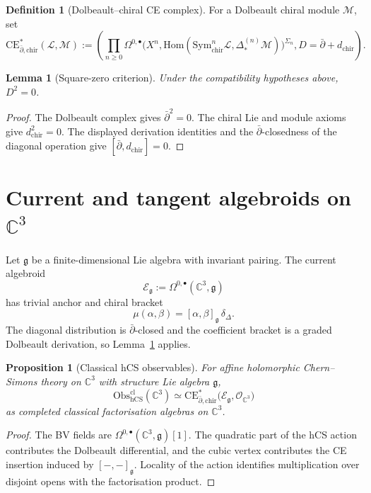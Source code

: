 \documentclass[11pt]{amsart}
\providecommand{\C}{\mathbb{C}}
\providecommand{\dbar}{\bar{\partial}}
\providecommand{\g}{\mathfrak{g}}
\providecommand{\Obs}{\mathrm{Obs}}
\providecommand{\Sym}{\mathrm{Sym}}
\providecommand{\CE}{\mathrm{CE}}
\providecommand{\chir}{\mathrm{chir}}
\providecommand{\Hom}{\mathrm{Hom}}
\providecommand{\cl}{\mathrm{cl}}
\providecommand{\hCS}{\mathrm{hCS}}
\providecommand{\cL}{\mathcal{L}}
\providecommand{\cM}{\mathcal{M}}
\providecommand{\cE}{\mathcal{E}}
\providecommand{\cO}{\mathcal{O}}
\theoremstyle{plain}
\newtheorem{proposition}[theorem]{Proposition}
\newtheorem{lemma}[theorem]{Lemma}
\theoremstyle{definition}
\newtheorem{definition}[theorem]{Definition}
\theoremstyle{remark}
\begin{document}
\begin{definition}[Dolbeault--chiral CE complex]
\label{def:dolbeault-chiral-ce}
For a Dolbeault chiral module $\cM$, set
\[
 \CE^*_{\dbar,\chir}(\cL,\cM)
 :=
 \left(
   \prod_{n\geq0}
   \Omega^{0,\bullet}\!\bigl(
     X^n,\Hom(\Sym^n_{\chir}\cL,\Delta^{(n)}_*\cM)
   \bigr)^{\Sigma_n},
   D=\dbar+d_{\chir}
 \right).
\]
\end{definition}

\begin{lemma}[Square-zero criterion]\label{lem:square-zero-criterion}
Under the compatibility hypotheses above, $D^2=0$.
\end{lemma}

\begin{proof}
The Dolbeault complex gives $\dbar^2=0$. The chiral Lie and module
axioms give $d_{\chir}^2=0$. The displayed derivation identities and
the $\dbar$-closedness of the diagonal operation give
$[\dbar,d_{\chir}]=0$.
\end{proof}

\section{Current and tangent algebroids on \texorpdfstring{$\C^3$}{C3}}
Let $\g$ be a finite-dimensional Lie algebra with invariant pairing.
The current algebroid
\[
  \cE_{\g}:=\Omega^{0,\bullet}(\C^3,\g)
\]
has trivial anchor and chiral bracket
\[
  \mu(\alpha,\beta)=[\alpha,\beta]_{\g}\,\delta_\Delta .
\]
The diagonal distribution is $\dbar$-closed and the coefficient bracket
is a graded Dolbeault derivation, so Lemma~\ref{lem:square-zero-criterion}
applies.

\begin{proposition}[Classical hCS observables]\label{prop:hcs-observables}
For affine holomorphic Chern--Simons theory on $\C^3$ with structure
Lie algebra $\g$,
\[
  \Obs_{\hCS}^{\cl}(\C^3)
  \simeq
  \CE^*_{\dbar,\chir}\!\bigl(\cE_{\g},\cO_{\C^3}\bigr)
\]
as completed classical factorisation algebras on $\C^3$.
\end{proposition}

\begin{proof}
The BV fields are $\Omega^{0,\bullet}(\C^3,\g)[1]$. The quadratic part
of the hCS action contributes the Dolbeault differential, and the cubic
vertex contributes the CE insertion induced by $[-,-]_{\g}$. Locality of
the action identifies multiplication over disjoint opens with the
factorisation product.
\end{proof}
\end{document}
